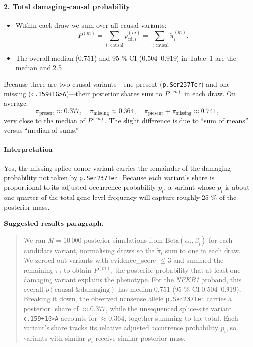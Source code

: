 \paragraph{2. Total damaging‑causal probability}
\begin{itemize}
  \item Within each draw we sum over all causal variants:
    \[
      P^{(m)} = \sum_{i:\,\text{causal}} p_{\text{cd},i}^{(m)}
              = \sum_{i:\,\text{causal}} \tilde\pi_i^{(m)}.
    \]
  \item The overall median (\(0.751\)) and 95 \% CI (\(0.504\)–\(0.919\)) in Table~1 are the median and 2.5 %
\end{itemize}

Because there are two causal variants—one present (\texttt{p.Ser237Ter}) and one missing (\texttt{c.159+1G>A})—their posterior shares sum to \(P^{(m)}\) in each draw.  On average:
\[
  \bar\pi_{\text{present}}
  \approx 0.377,
  \quad
  \bar\pi_{\text{missing}}
  \approx 0.364,
  \quad
  \bar\pi_{\text{present}} + \bar\pi_{\text{missing}}
  \approx 0.741,
\]
very close to the median of \(P^{(m)}\).  The slight difference is due to “sum of means” versus “median of sums.”

\paragraph*{Interpretation}
Yes, the missing splice‐donor variant carries the remainder of the damaging probability not taken by \texttt{p.Ser237Ter}.  Because each variant’s share is proportional to its adjusted occurrence probability \(p_i\), a variant whose \(p_i\) is about one‑quarter of the total gene‑level frequency will capture roughly 25 \% of the posterior mass.

\bigskip

\noindent\textbf{Suggested results paragraph:}

\begin{quote}
We ran \(M=10\,000\) posterior simulations from \(\mathrm{Beta}(\alpha_i,\beta_i)\) for each candidate variant, normalising draws so the \(\tilde\pi_i\) sum to one in each draw.  We zeroed out variants with evidence\_score \(\le3\) and summed the remaining \(\tilde\pi_i\) to obtain \(P^{(m)}\), the posterior probability that at least one damaging variant explains the phenotype.  For the \textit{NFKB1} proband, this overall \(p(\text{causal \& damaging})\) has median 0.751 (95 \% CI 0.504–0.919).  Breaking it down, the observed nonsense allele \texttt{p.Ser237Ter} carries a posterior\_share of \(\approx0.377\), while the unsequenced splice‐site variant \texttt{c.159+1G>A} accounts for \(\approx0.364\), together summing to the total.  Each variant’s share tracks its relative adjusted occurrence probability \(p_i\), so variants with similar \(p_i\) receive similar posterior mass.
\end{quote}


